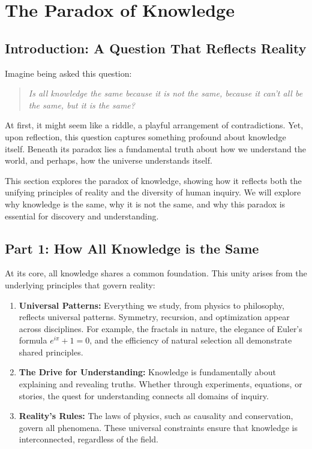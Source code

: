\documentclass[12pt]{article}
\begin{document}
\section{The Paradox of Knowledge}

\subsection*{Introduction: A Question That Reflects Reality}
Imagine being asked this question:
\begin{quote}
\textit{Is all knowledge the same because it is not the same, because it can't all be the same, but it is the same?}
\end{quote}

At first, it might seem like a riddle, a playful arrangement of contradictions. Yet, upon reflection, this question captures something profound about knowledge itself. Beneath its paradox lies a fundamental truth about how we understand the world, and perhaps, how the universe understands itself.

This section explores the paradox of knowledge, showing how it reflects both the unifying principles of reality and the diversity of human inquiry. We will explore why knowledge is the same, why it is not the same, and why this paradox is essential for discovery and understanding.

\subsection*{Part 1: How All Knowledge is the Same}
At its core, all knowledge shares a common foundation. This unity arises from the underlying principles that govern reality:
\begin{enumerate}
    \item \textbf{Universal Patterns:} Everything we study, from physics to philosophy, reflects universal patterns. Symmetry, recursion, and optimization appear across disciplines. For example, the fractals in nature, the elegance of Euler's formula $e^{i\pi} + 1 = 0$, and the efficiency of natural selection all demonstrate shared principles.
    
    \item \textbf{The Drive for Understanding:} Knowledge is fundamentally about explaining and revealing truths. Whether through experiments, equations, or stories, the quest for understanding connects all domains of inquiry.
    
    \item \textbf{Reality's Rules:} The laws of physics, such as causality and conservation, govern all phenomena. These universal constraints ensure that knowledge is interconnected, regardless of the field.
\end{enumerate}
\end{document}
